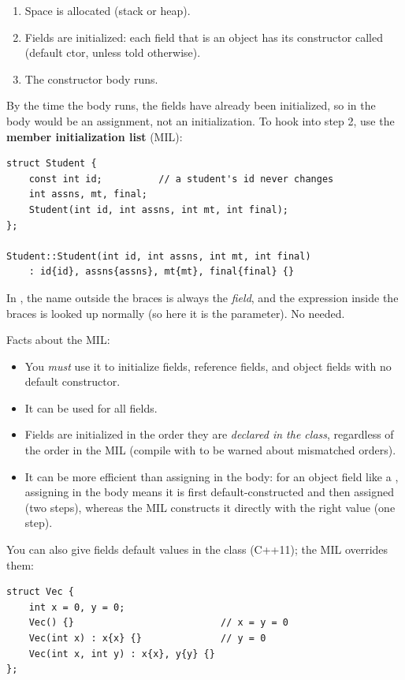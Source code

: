 \begin{important}
\begin{enumerate}
  \item Space is allocated (stack or heap).
  \item Fields are initialized: each field that is an object has its
        constructor called (default ctor, unless told otherwise).
  \item The constructor body runs.
\end{enumerate}
\end{important}

By the time the body runs, the fields have already been initialized, so
 in the body would be an assignment, not an initialization.
To hook into step 2, use the \textbf{member initialization list} (MIL):
\begin{lstlisting}[style=cpp]
struct Student {
    const int id;          // a student's id never changes
    int assns, mt, final;
    Student(int id, int assns, int mt, int final);
};

Student::Student(int id, int assns, int mt, int final)
    : id{id}, assns{assns}, mt{mt}, final{final} {}
\end{lstlisting}
In , the name outside the braces is always the \emph{field}, and
the expression inside the braces is looked up normally (so here it is the
parameter). No  needed.

Facts about the MIL:
\begin{itemize}
  \item You \emph{must} use it to initialize  fields, reference
        fields, and object fields with no default constructor.
  \item It can be used for all fields.
  \item Fields are initialized in the order they are \emph{declared in the
        class}, regardless of the order in the MIL (compile with 
        to be warned about mismatched orders).
  \item It can be more efficient than assigning in the body: for an object
        field like a , assigning in the body means it is first
        default-constructed and then assigned (two steps), whereas the MIL
        constructs it directly with the right value (one step).
\end{itemize}

You can also give fields default values in the class (C++11); the MIL overrides
them:
\begin{lstlisting}[style=cpp]
struct Vec {
    int x = 0, y = 0;
    Vec() {}                          // x = y = 0
    Vec(int x) : x{x} {}              // y = 0
    Vec(int x, int y) : x{x}, y{y} {}
};
\end{lstlisting}

